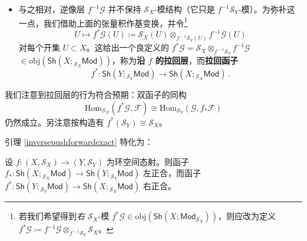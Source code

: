 \begin{Def}
\begin{itemize}[leftmargin=0.5cm]
	\item 与之相对，逆像层 $f^{-1}\mathcal{G}$ 并不保持 $\mathcal{S}_X$-模结构（它只是 $f^{-1}\mathcal{S}_Y$-模）。为弥补这一点，我们借助上面的张量积作基变换，并令\footnote{若我们希望得到\textit{右} $\mathcal{S}_X$-模 $f^*\mathcal{G}\in\text{obj}(\mathsf{Sh}(X;\mathsf{Mod}_{\mathcal{S}_X}))$，则应改为定义 $f^*\mathcal{G}\coloneqq f^{-1}\mathcal{G}\otimes_{f^{\!-\!1}\!\mathcal{S}_Y}\!\mathcal{S}_X$。}
	\begin{equation}
		U\mapsto f^*\mathcal{G}(U)\coloneqq\mathcal{S}_X(U)\otimes_{f^{\!-\!1}\!\mathcal{S}_Y(U)}\!f^{-1}\mathcal{G}(U)
	\end{equation}
	对每个开集 $U\!\subset\! X$。这给出一个良定义的 $f^*\mathcal{G}\!=\!\mathcal{S}_X\!\otimes_{f^{\!-\!1}\!\mathcal{S}_Y}\! f^{-1}\mathcal{G}$ $\in\text{obj}(\mathsf{Sh}(X;{}_{\mathcal{S}_X}\!\mathsf{Mod}))$，称为\textbf{沿 $f$ 的拉回层}，而\textbf{拉回函子}
	\begin{equation}
		f^*:\mathsf{Sh}(Y;{}_{\mathcal{S}_Y}\!\mathsf{Mod})\rightarrow\mathsf{Sh}(X;{}_{\mathcal{S}_X}\!\mathsf{Mod})\,.
	\end{equation}
\end{itemize}
我们注意到拉回层的行为符合预期：双函子的同构
\begin{equation}\label{pullpushareadjoints}
	\text{Hom}_{\mathcal{S}_X}(f^*\mathcal{G},\mathcal{F})\cong\text{Hom}_{\mathcal{S}_Y}(\mathcal{G},f_*\mathcal{F})
\end{equation}
仍然成立。另注意按构造有 $f^*(\mathcal{S}_Y)\cong\mathcal{S}_X$。
\end{Def}

引理 \ref{inversepushforwardexact} 特化为：

\begin{Cor}\label{pullbackpushforwardexact}
设 $f:(X,\mathcal{S}_X)\rightarrow (Y,\mathcal{S}_Y)$ 为环空间态射。则函子 $f_*:\mathsf{Sh}(X;{}_{\mathcal{S}_X}\!\mathsf{Mod})\rightarrow\mathsf{Sh}(Y;{}_{\mathcal{S}_Y}\!\mathsf{Mod})$ 左正合，而函子 $f^*:\mathsf{Sh}(Y;{}_{\mathcal{S}_Y}\!\mathsf{Mod})\rightarrow\mathsf{Sh}(X;{}_{\mathcal{S}_X}\!\mathsf{Mod})$ 右正合。
\end{Cor}

